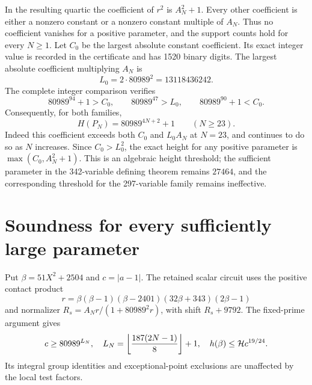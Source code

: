 \documentclass[11pt,a4paper]{article}
\theoremstyle{remark}\newtheorem{remark}[theorem]{Remark}
\begin{document}
In the resulting quartic the coefficient of $r^2$ is $A_N^2+1$.
Every other coefficient is either a nonzero constant or a nonzero constant
multiple of $A_N$. Thus no coefficient vanishes for a positive parameter,
and the support counts hold for every $N\ge1$.
Let $C_0$ be the largest absolute constant coefficient. Its exact integer
value is recorded in the certificate and has 1520 binary digits. The
largest absolute coefficient multiplying $A_N$ is
\[
                       L_0=2\cdot80989^2=13118436242.
\]
The complete integer comparison verifies
\[
 80989^{94}+1>C_0,\qquad80989^{47}>L_0,
 \qquad80989^{90}+1<C_0.
\]
Consequently, for both families,
\[
                        H(P_N)=80989^{4N+2}+1
                        \qquad(N\ge23).
\]
Indeed this coefficient exceeds both $C_0$ and $L_0A_N$ at $N=23$,
and continues to do so as $N$ increases. Since $C_0>L_0^2$, the exact
height for any positive parameter is $\max(C_0,A_N^2+1)$.
This is an algebraic height threshold; the sufficient parameter in the
342-variable defining theorem remains $27464$, and the corresponding
threshold for the 297-variable family remains ineffective.

\section{Soundness for every sufficiently large parameter}
Put $\beta=51X^2+2504$ and $c=|a-1|$. The retained scalar circuit
uses the positive contact product
\[
 r=\beta(\beta-1)(\beta-2401)(32\beta+343)(2\beta-1)
\]
and normalizer $R_s=A_Nr/(1+80989^2r)$, with shift $R_s+9792$.
The fixed-prime argument gives
\begin{equation}\label{eq:scalar}
 c\ge80989^{L_N},\quad
 L_N=\left\lfloor\frac{187(2N-1)}8\right\rfloor+1,\quad
 h(\beta)\le\mathcal H c^{19/24}.
\end{equation}
Its integral group identities and exceptional-point exclusions are
unaffected by the local test factors.
\end{document}

